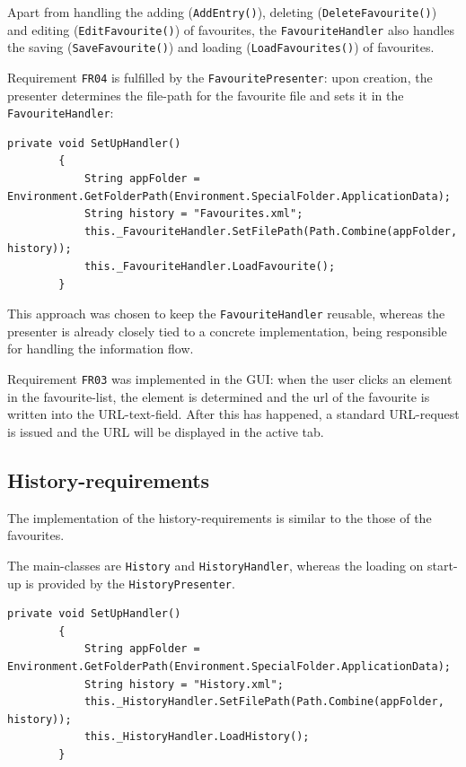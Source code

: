 Apart from handling the adding (\texttt{AddEntry()}), deleting (\texttt{DeleteFavourite()}) and editing (\texttt{EditFavourite()}) of favourites, the \texttt{FavouriteHandler} also handles the saving (\texttt{SaveFavourite()}) and loading (\texttt{LoadFavourites()}) of favourites.

Requirement \texttt{FR04} is fulfilled by the  \texttt{FavouritePresenter}: upon creation, the presenter determines the file-path for the favourite file and sets it in the \texttt{FavouriteHandler}:

\begin{lstlisting}[caption=Setting up the favourite handler's filepath.]
private void SetUpHandler()
        {
            String appFolder = Environment.GetFolderPath(Environment.SpecialFolder.ApplicationData);
            String history = "Favourites.xml";
            this._FavouriteHandler.SetFilePath(Path.Combine(appFolder, history));
            this._FavouriteHandler.LoadFavourite();
        }
\end{lstlisting}

This approach was chosen to keep the \texttt{FavouriteHandler} reusable, whereas the presenter is already closely tied to a concrete implementation, being responsible for handling the information flow.

Requirement \texttt{FR03} was implemented in the \ac{GUI}: when the user clicks an element in the favourite-list, the element is determined and the url of the favourite is written into the \ac{URL}-text-field. After this has happened, a standard \ac{URL}-request is issued and the \ac{URL} will be displayed in the active tab.

\subsection{History-requirements}

The implementation of the history-requirements is similar to the those of the favourites.

The main-classes are \texttt{History} and \texttt{HistoryHandler}, whereas the loading on start-up is provided by the \texttt{HistoryPresenter}.

\begin{lstlisting}[caption=Setting up the history handler's filepath.]
private void SetUpHandler()
        {
            String appFolder = Environment.GetFolderPath(Environment.SpecialFolder.ApplicationData);
            String history = "History.xml";
            this._HistoryHandler.SetFilePath(Path.Combine(appFolder, history));
            this._HistoryHandler.LoadHistory();
        }
\end{lstlisting}

